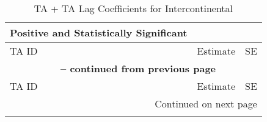 \begin{center}
\small
\begin{longtable}{lcc}
    \caption{TA + TA Lag Coefficients for Intercontinental} \label{tab:pta_intercontinental} \\
    
    \hline
    \textbf{Positive and Statistically Significant} &  &  \\
    \hline
    TA ID & Estimate & SE \\
    \hline
    \endfirsthead
    
    \multicolumn{3}{c}{{\bfseries \tablename\ \thetable{} -- continued from previous page}} \\
    \hline
    TA ID & Estimate & SE \\
    \hline
    \endhead
    
    \hline \multicolumn{3}{r}{{Continued on next page}} \\ \hline
    \endfoot
    
    \hline
    \endlastfoot
    

\end{longtable}
\end{center}
